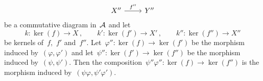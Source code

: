 \begin{lemma}
\begin{enumerate}
\[\begin{tikzcd}
          \\
            X''
            \arrow{r}[above]{f''}
          & Y''
        \end{tikzcd}
      \]
      be a commutative diagram in~$\mathcal{A}$ and let
      \[
        k \colon \ker(f) \to X \,,
        \qquad
        k' \colon \ker(f') \to X' \,,
        \qquad
        k'' \colon \ker(f'') \to X''
      \]
      be kernels of~$f$,~$f'$ and~$f''$.
      Let~$\varphi'' \colon \ker(f) \to \ker(f')$ be the morphism induced by~$(\varphi,\varphi')$ and let~$\psi'' \colon \ker(f') \to \ker(f'')$ be the morphism induced by~$(\psi, \psi')$.
      Then the composition~$\psi'' \varphi'' \colon \ker(f) \to \ker(f'')$ is the morphism induced by~$(\psi \varphi, \psi' \varphi')$.
  \end{enumerate}
\end{lemma}

